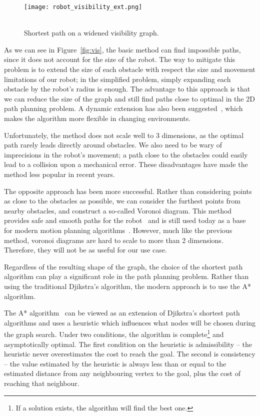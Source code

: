\begin{wrapfigure}{l}{0.33\textwidth}
    \centering
    \texttt{[image: robot\_visibility\_ext.png]}
  \caption{\\Shortest path on a widened visibility graph.}\label{fig:vis_ext}
\end{wrapfigure}

As we can see in Figure~\ref{fig:vis}, the basic method can find impossible paths, since it does not account for the size of the robot. The way to mitigate this problem is to extend the size of each obstacle with respect the size and movement limitations of our robot; in the simplified problem, simply expanding each obstacle by the robot's radius is enough. The advantage to this approach is that we can reduce the size of the graph and still find paths close to optimal in the 2D path planning problem. A dynamic extension has also been suggested~\cite{DVG}, which makes the algorithm more flexible in changing environments.

Unfortunately, the method does not scale well to 3 dimensions, as the optimal path rarely leads directly around obstacles. We also need to be wary of imprecisions in the robot's movement; a path close to the obstacles could easily lead to a collision upon a mechanical error. These disadvantages have made the method less popular in recent years.

The opposite approach has been more successful. Rather than considering points as close to the obstacles as possible, we can consider the furthest points from nearby obstacles, and construct a so-called Voronoi diagram. This method provides safe and smooth paths for the robot~\cite{voronoi} and is still used today as a base for modern motion planning algorithms~\cite{voronoi2}. However, much like the previous method, voronoi diagrams are hard to scale to more than 2 dimensions. Therefore, they will not be as useful for our use case.

Regardless of the resulting shape of the graph, the choice of the shortest path algorithm can play a significant role in the path planning problem. Rather than using the traditional Djikstra's algorithm, the modern approach is to use the A* algorithm.

The A* algorithm~\cite{ai_modern} can be viewed as an extension of Djikstra's shortest path algorithms and uses a heuristic which influences what nodes will be chosen during the graph search. Under two conditions, the algorithm is complete\footnote{If a solution exists, the algorithm will find the best one.} and asymptotically optimal. The first condition on the heuristic is admissibility -- the heuristic never overestimates the cost to reach the goal. The second is consistency -- the value estimated by the heuristic is always less than or equal to the estimated distance from any neighbouring vertex to the goal, plus the cost of reaching that neighbour.


